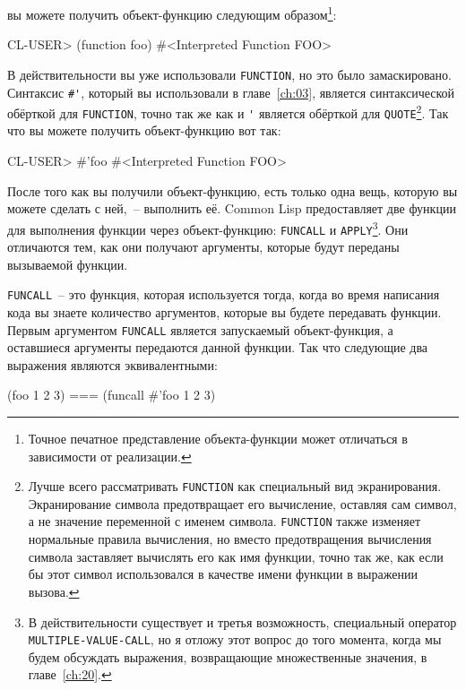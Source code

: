 \noindent{}вы можете получить объект-функцию следующим образом\footnote{Точное печатное
  представление объекта-функции может отличаться в зависимости от реализации.}:

\begin{myverb}
CL-USER> (function foo)
#<Interpreted Function FOO>
\end{myverb}

В действительности вы уже использовали \lstinline{FUNCTION}, но это было
замаскировано. Синтаксис \lstinline!#'!, который вы использовали в
главе~\ref{ch:03}, является синтаксической обёрткой для \lstinline{FUNCTION}, точно
так же как и \lstinline{'} является обёрткой для \lstinline{QUOTE}\footnote{Лучше всего
  рассматривать \lstinline{FUNCTION} как специальный вид экранирования.
  Экранирование символа предотвращает его вычисление, оставляя сам символ, а не
  значение переменной с именем символа. \lstinline{FUNCTION} также изменяет
  нормальные правила вычисления, но вместо предотвращения вычисления символа
  заставляет вычислять его как имя функции, точно так же, как если бы этот символ
  использовался в качестве имени функции в выражении вызова.}.  Так что вы можете
  получить объект-функцию вот так:

\begin{myverb}
CL-USER> #'foo
#<Interpreted Function FOO>
\end{myverb}

После того как вы получили объект-функцию, есть только одна вещь, которую вы можете
сделать с ней,~-- выполнить её. Common Lisp предоставляет две функции для выполнения
функции через объект-функцию: \lstinline{FUNCALL} и \lstinline{APPLY}\footnote{В действительности
  существует и третья возможность, специальный оператор \lstinline{MULTIPLE-VALUE-CALL}, но я
  отложу этот вопрос до того момента, когда мы будем обсуждать выражения, возвращающие
  множественные значения, в главе~\ref{ch:20}.}. Они отличаются тем, как они получают
  аргументы, которые будут переданы вызываемой функции.

\lstinline{FUNCALL}~-- это функция, которая используется тогда, когда во время написания кода вы
знаете количество аргументов, которые вы будете передавать функции.  Первым аргументом
\lstinline{FUNCALL} является запускаемый объект-функция, а оставшиеся аргументы передаются
данной функции.  Так что следующие два выражения являются эквивалентными:

\begin{myverb}
(foo 1 2 3) === (funcall #'foo 1 2 3)
\end{myverb}

